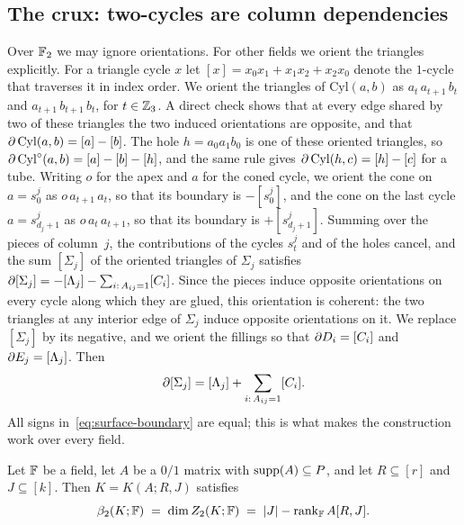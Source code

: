 \subsection{The crux: two-cycles are column dependencies}\label{sec:crux}

Over $\mathbb{F}_2$ we may ignore orientations.
For other fields we orient the triangles explicitly.
For a triangle cycle $x$ let $[x]=x_0x_1+x_1x_2+x_2x_0$ denote the $1$-cycle that traverses it in index order.
We orient the triangles of $\mathrm{Cyl}(a,b)$ as $a_t\,a_{t+1}\,b_t$ and $a_{t+1}\,b_{t+1}\,b_t$, for $t\in\mathbb{Z}_3$.
A direct check shows that at every edge shared by two of these triangles the two induced orientations are opposite, and that ${\partial\,\mathrm{Cyl}(a,b)=[a]-[b]}$.
The hole $h=a_0a_1b_0$ is one of these oriented triangles, so $\partial\,\mathrm{Cyl}^{\circ}(a,b)=[a]-[b]-[h]$, and the same rule gives $\partial\,\mathrm{Cyl}(h,c)=[h]-[c]$ for a tube.
Writing $o$ for the apex and $a$ for the coned cycle, we orient the cone on $a=s^j_0$ as $o\,a_{t+1}\,a_t$, so that its boundary is $-[s^j_0]$, and the cone on the last cycle $a=s^j_{d_j+1}$ as $o\,a_t\,a_{t+1}$, so that its boundary is $+[s^j_{d_j+1}]$.
Summing over the pieces of column~$j$, the contributions of the cycles $s^j_t$ and of the holes cancel, and the sum $[\Sigma_j]$ of the oriented triangles of $\Sigma_j$ satisfies $\partial[\Sigma_j]=-[\Lambda_j]-\sum_{i:\,A_{ij}=1}[C_i]$.
Since the pieces induce opposite orientations on every cycle along which they are glued, this orientation is coherent: the two triangles at any interior edge of $\Sigma_j$ induce opposite orientations on it.
We replace $[\Sigma_j]$ by its negative, and we orient the fillings so that $\partial D_i=[C_i]$ and $\partial E_j=[\Lambda_j]$.
Then
\begin{equation}\label{eq:surface-boundary}
  \partial[\Sigma_j]=[\Lambda_j]+\sum_{i:\,A_{ij}=1}[C_i].
\end{equation}
All signs in~\eqref{eq:surface-boundary} are equal; this is what makes the construction work over every field.

\begin{lemma}[Crux]\label{lem:crux}
Let $\mathbb{F}$ be a field, let $A$ be a $0/1$ matrix with $\operatorname{supp}(A)\subseteq P$, and let $R\subseteq[r]$ and $J\subseteq[k]$.
Then $K=K(A;R,J)$ satisfies
\[
  \beta_2(K;\mathbb{F})\;=\;\dim Z_2(K;\mathbb{F})\;=\;|J|-\operatorname{rank}_{\mathbb{F}}A[R,J].
\]
\end{lemma}

